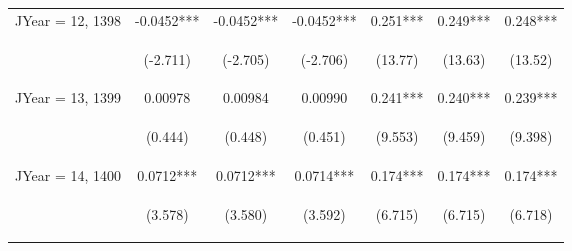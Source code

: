 \documentclass[]{article}
\begin{document}
\begin{center}
\begin{tabular}{lcccccc}
JYear = 12, 1398 & -0.0452*** & -0.0452*** & -0.0452*** & 0.251*** & 0.249*** & 0.248*** \\
\vspace{4pt} & \begin{footnotesize}(-2.711)\end{footnotesize} & \begin{footnotesize}(-2.705)\end{footnotesize} & \begin{footnotesize}(-2.706)\end{footnotesize} & \begin{footnotesize}(13.77)\end{footnotesize} & \begin{footnotesize}(13.63)\end{footnotesize} & \begin{footnotesize}(13.52)\end{footnotesize} \\
JYear = 13, 1399 & 0.00978 & 0.00984 & 0.00990 & 0.241*** & 0.240*** & 0.239*** \\
\vspace{4pt} & \begin{footnotesize}(0.444)\end{footnotesize} & \begin{footnotesize}(0.448)\end{footnotesize} & \begin{footnotesize}(0.451)\end{footnotesize} & \begin{footnotesize}(9.553)\end{footnotesize} & \begin{footnotesize}(9.459)\end{footnotesize} & \begin{footnotesize}(9.398)\end{footnotesize} \\
JYear = 14, 1400 & 0.0712*** & 0.0712*** & 0.0714*** & 0.174*** & 0.174*** & 0.174*** \\
\vspace{4pt} & \begin{footnotesize}(3.578)\end{footnotesize} & \begin{footnotesize}(3.580)\end{footnotesize} & \begin{footnotesize}(3.592)\end{footnotesize} & \begin{footnotesize}(6.715)\end{footnotesize} & \begin{footnotesize}(6.715)\end{footnotesize} & \begin{footnotesize}(6.718)\end{footnotesize} \\

\end{tabular}
\end{center}
\end{document}

